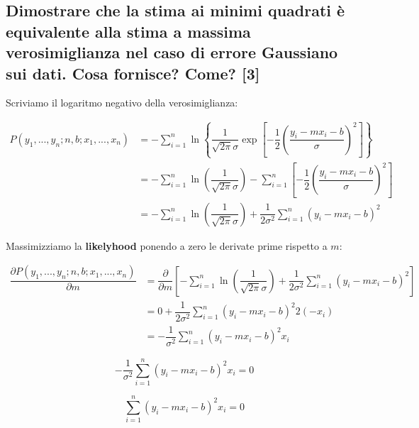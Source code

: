 \documentclass[\main/main.tex]{subfiles}
\begin{document}
\subsection{Dimostrare che la stima ai minimi quadrati è equivalente alla stima a massima verosimiglianza nel caso di errore Gaussiano sui dati. Cosa fornisce? Come? [3]}
Scriviamo il logaritmo negativo della verosimiglianza:

\begin{align}
	P \left(y_1,...,y_n; n, b; x_1, ..., x_n \right) & =
	- \sum_{i=1}^n
	\ln \left\{
	\dfrac{1}{\sqrt{2\pi}\sigma}
	\exp \left[
		-\dfrac{1}{2}	\left(\dfrac{ y_i - mx_i - b}{\sigma} \right)^2
		\right]
	\right\}                                             \\
	                                                 & =
	- \sum_{i=1}^n \ln
	\left ( \dfrac{1}{\sqrt{2\pi}\sigma} \right )
	- \sum_{i=1}^n
	\left[
		-\dfrac{1}{2}	\left(\dfrac{ y_i - mx_i - b}{\sigma} \right)^2
		\right]                                              \\
	                                                 & =
	- \sum_{i=1}^n \ln
	\left ( \dfrac{1}{\sqrt{2\pi}\sigma} \right )
	+ \dfrac{1}{2\sigma^2} \sum_{i=1}^n
	\left(y_i - mx_i - b \right)^2
\end{align}

Massimizziamo la \textbf{likelyhood} ponendo a zero le derivate prime rispetto a $m$:

\begin{align}
	\dfrac{\partial P \left(y_1,...,y_n; n, b; x_1, ..., x_n \right)}{\partial m} & = \dfrac{\partial}{\partial m} \left [ - \sum_{i=1}^n \ln
		\left ( \dfrac{1}{\sqrt{2\pi}\sigma} \right )
		+ \dfrac{1}{2\sigma^2} \sum_{i=1}^n
		\left(y_i - mx_i - b \right)^2
		\right ]                                                                                                                                                        \\
	                                                                              & = 0 + \dfrac{1}{2\sigma^2} \sum_{i=1}^n \left(y_i - mx_i - b \right)^2 2 (-x_i) \\
	                                                                              & = -\dfrac{1}{\sigma^2} \sum_{i=1}^n \left(y_i - mx_i - b \right)^2  x_i
\end{align}

\[
	-\dfrac{1}{\sigma^2} \sum_{i=1}^n \left(y_i - mx_i - b \right)^2  x_i = 0
\]

\[
	\sum_{i=1}^n \left(y_i - mx_i - b \right)^2  x_i = 0
\]
\end{document}
